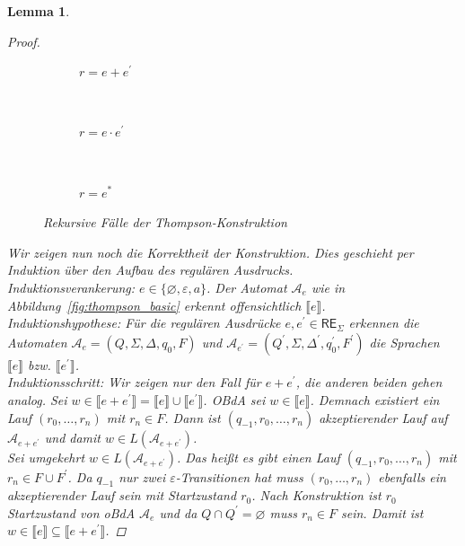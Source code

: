 \documentclass[11pt, a4paper]{article}
\theoremstyle{definition}
\theoremstyle{plain}
\newtheorem{lemma}[definition]{Lemma}
\numberwithin{equation}{section}
\let\emptyset\varnothing
\begin{document}
\begin{lemma}
\begin{proof}
		\begin{figure}
			\centering
			\begin{subfigure}[b]{.9\textwidth}
				\centering
				
				\caption{$r = e + e^\prime$}
				\label{fig:thompson_plus}
			\end{subfigure}\\
			\begin{subfigure}[b]{.9\textwidth}
				\centering
				
				\caption{$r = e \cdot e^\prime$}
				\label{fig:thompson_cat}
			\end{subfigure}\\
			\begin{subfigure}[b]{.9\textwidth}
				\centering
				
				\caption{$r = e^\ast$}
				\label{fig:thompson_star}
			\end{subfigure}
			\caption{Rekursive Fälle der Thompson-Konstruktion}
			\label{fig:thompson_recursive}
		\end{figure}
		Wir zeigen nun noch die Korrektheit der Konstruktion. Dies geschieht per Induktion über den Aufbau des regulären Ausdrucks.\\
		Induktionsverankerung: $e \in \{\emptyset, \varepsilon, a\}$. Der Automat $\mathcal{A}_e$ wie in Abbildung~\ref{fig:thompson_basic} erkennt offensichtlich $\llbracket e \rrbracket$.\checkmark\\
		Induktionshypothese: Für die regulären Ausdrücke $e, e^\prime \in \mathsf{RE}_\Sigma$ erkennen die Automaten $\mathcal{A}_e = (Q, \Sigma, \Delta, q_0, F)$ und $\mathcal{A}_{e^\prime} = (Q^\prime, \Sigma, \Delta^\prime, q_0^\prime, F^\prime)$ die Sprachen $\llbracket e \rrbracket$ bzw. $\llbracket e^\prime \rrbracket$.\\
		Induktionsschritt: Wir zeigen nur den Fall für $e + e^\prime$, die anderen beiden gehen analog.
		Sei $w \in \llbracket e + e^\prime \rrbracket = \llbracket e \rrbracket \cup \llbracket e^\prime \rrbracket$. OBdA sei $w \in \llbracket e \rrbracket$. Demnach existiert ein Lauf $(r_0, \ldots, r_n)$ mit $r_n \in F$. Dann ist $(q_{-1}, r_0, \ldots, r_n)$ akzeptierender Lauf auf $\mathcal{A}_{e+e^\prime}$ und damit $w \in L(\mathcal{A}_{e+e^\prime})$.\\
		Sei umgekehrt $w \in L(\mathcal{A}_{e+e^\prime})$. Das heißt es gibt einen Lauf $(q_{-1}, r_0, \ldots, r_n)$ mit $r_n \in F \cup F^\prime$. Da $q_{-1}$ nur zwei $\varepsilon$-Transitionen hat muss $(r_0, \ldots, r_n)$ ebenfalls ein akzeptierender Lauf sein mit Startzustand $r_0$. Nach Konstruktion ist $r_0$ Startzustand von oBdA $\mathcal{A}_e$ und da $Q \cap Q^\prime = \emptyset$ muss $r_n \in F$ sein. Damit ist $w \in \llbracket e \rrbracket \subseteq \llbracket e+e^\prime \rrbracket$.
	\end{proof}
\end{lemma}
\end{document}
